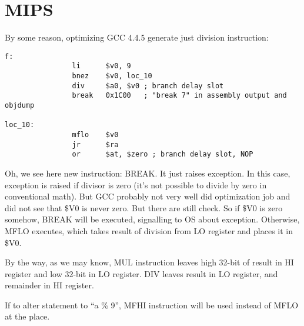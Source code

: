 ﻿\section{MIPS}

By some reason, optimizing GCC 4.4.5 generate just division instruction:

\begin{lstlisting}[caption=\Optimizing GCC 4.4.5 (IDA)]
f:
                li      $v0, 9
                bnez    $v0, loc_10
                div     $a0, $v0 ; branch delay slot
                break   0x1C00   ; "break 7" in assembly output and objdump

loc_10:
                mflo    $v0
                jr      $ra
                or      $at, $zero ; branch delay slot, NOP
\end{lstlisting}

Oh, we see here new instruction: BREAK. It just raises exception.
In this case, exception is raised if divisor is zero (it's not possible to divide by zero in conventional
math).
But GCC probably not very well did optimization job and did not see that \$V0 is never zero.
But there are still check.
So if \$V0 is zero somehow, BREAK will be executed, signalling to \ac{OS} about exception.
Otherwise, MFLO executes, which takes result of division from LO register and places it in \$V0.

By the way, as we may know, MUL instruction leaves high 32-bit of result in HI register and low 32-bit
in LO register.
DIV leaves result in LO register, and remainder in HI register.

If to alter statement to ``a \% 9'', MFHI instruction will be used instead of MFLO at the place.
